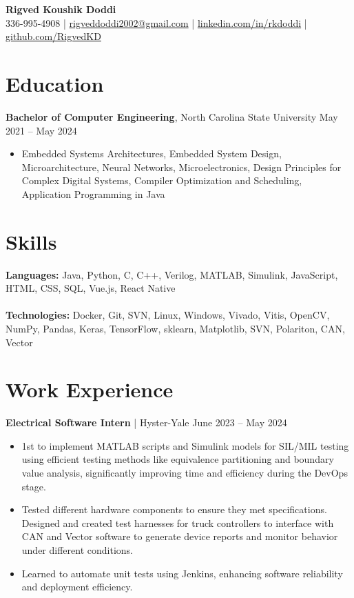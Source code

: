 \documentclass[letterpaper,9pt]{article}
\begin{document}
\begin{center}
    {\Large \textbf{Rigved Koushik Doddi}}\\
    \vspace{1pt}
    \small 336-995-4908 | \href{mailto:rigveddoddi2002@gmail.com}{rigveddoddi2002@gmail.com} | \href{https://www.linkedin.com/in/rkdoddi/}{linkedin.com/in/rkdoddi} | \href{https://github.com/RigvedKD}{github.com/RigvedKD}\\
\end{center}

\section*{Education}
\noindent \textbf{Bachelor of Computer Engineering}, North Carolina State University \hfill May 2021 – May 2024
\begin{itemize}[leftmargin=*,itemsep=0pt,topsep=0pt]
    \item Embedded Systems Architectures, Embedded System Design, Microarchitecture, Neural Networks, Microelectronics, Design Principles for Complex Digital Systems, Compiler Optimization and Scheduling, Application Programming in Java
\end{itemize}

\section*{Skills}
\noindent \textbf{Languages:} Java, Python, C, C++, Verilog, MATLAB, Simulink, JavaScript, HTML, CSS, SQL, Vue.js, React Native \\\\
\noindent \textbf{Technologies:} Docker, Git, SVN, Linux, Windows, Vivado, Vitis, OpenCV, NumPy, Pandas, Keras, TensorFlow, sklearn, Matplotlib, SVN, Polariton, CAN, Vector

\section*{Work Experience}
\noindent \textbf{Electrical Software Intern} | Hyster-Yale \hfill June 2023 – May 2024
\begin{itemize}[leftmargin=*,itemsep=0pt,topsep=0pt]
\item 1st to implement MATLAB scripts and Simulink models for SIL/MIL testing using efficient testing methods like equivalence partitioning and boundary value analysis, significantly improving time and efficiency during the DevOps stage.
\item Tested different hardware components to ensure they met specifications. Designed and created test harnesses for truck controllers to interface with CAN and Vector software to generate device reports and monitor behavior under different conditions.
\item Learned to automate unit tests using Jenkins, enhancing software reliability and deployment efficiency.
\end{itemize}
\end{document}
